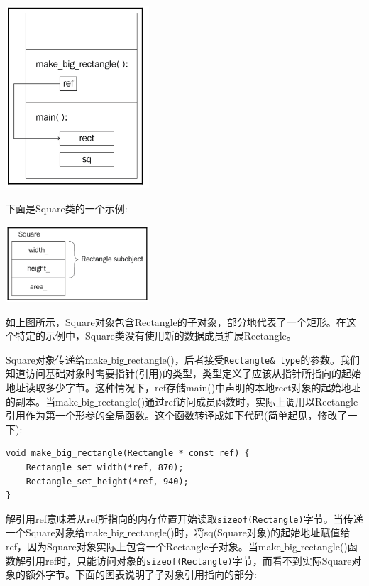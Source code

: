 \begin{center}
	\includegraphics[width=0.4\textwidth]{content/Section-1/Chapter-3/14}
\end{center}

下面是Square类的一个示例: \par

\begin{center}
	\includegraphics[width=0.4\textwidth]{content/Section-1/Chapter-3/15}
\end{center}

如上图所示，Square对象包含Rectangle的子对象，部分地代表了一个矩形。在这个特定的示例中，Square类没有使用新的数据成员扩展Rectangle。 \par
Square对象传递给make\underline{ }big\underline{ }rectangle()，后者接受\texttt{Rectangle\& type}的参数。我们知道访问基础对象时需要指针(引用)的类型，类型定义了应该从指针所指向的起始地址读取多少字节。这种情况下，ref存储main()中声明的本地rect对象的起始地址的副本。当make\underline{ }big\underline{ }rectangle()通过ref访问成员函数时，实际上调用以Rectangle引用作为第一个形参的全局函数。这个函数转译成如下代码(简单起见，修改了一下): \par

\begin{lstlisting}[caption={}]
void make_big_rectangle(Rectangle * const ref) {
	Rectangle_set_width(*ref, 870);
	Rectangle_set_height(*ref, 940);
}
\end{lstlisting}

解引用ref意味着从ref所指向的内存位置开始读取\texttt{sizeof(Rectangle)}字节。当传递一个Square对象给make\underline{ }big\underline{ }rectangle()时，将sq(Square对象)的起始地址赋值给ref，因为Square对象实际上包含一个Rectangle子对象。当make\underline{ }big\underline{ }rectangle()函数解引用ref时，只能访问对象的\texttt{sizeof(Rectangle)}字节，而看不到实际Square对象的额外字节。下面的图表说明了子对象引用指向的部分: \par

